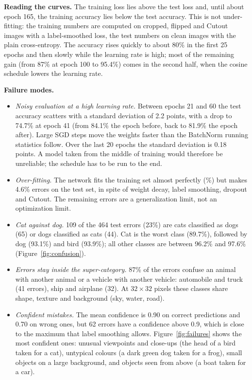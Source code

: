 \documentclass[11pt,a4paper]{article}
\begin{document}
\textbf{Reading the curves.} The training loss lies above the test loss and, until about epoch 165, the training accuracy lies below the test accuracy. This is not under-fitting: the training numbers are computed on cropped, flipped and Cutout images with a label-smoothed loss, the test numbers on clean images with the plain cross-entropy. The accuracy rises quickly to about 80\% in the first 25 epochs and then slowly while the learning rate is high; most of the remaining gain (from 87\% at epoch 100 to 95.4\%) comes in the second half, when the cosine schedule lowers the learning rate.

\textbf{Failure modes.}
\begin{itemize}
\item \emph{Noisy evaluation at a high learning rate.} Between epochs 21 and 60 the test accuracy scatters with a standard deviation of 2.2 points, with a drop to 74.7\% at epoch 41 (from 84.1\% the epoch before, back to 81.9\% the epoch after). Large SGD steps move the weights faster than the BatchNorm running statistics follow. Over the last 20 epochs the standard deviation is 0.18 points. A model taken from the middle of training would therefore be unreliable; the schedule has to be run to the end.
\item \emph{Over-fitting.} The network fits the training set almost perfectly (\BaselineTrainAcc\%) but makes 4.6\% errors on the test set, in spite of weight decay, label smoothing, dropout and Cutout. The remaining errors are a generalization limit, not an optimization limit.
\item \emph{Cat against dog.} 109 of the 464 test errors (23\%) are cats classified as dogs (65) or dogs classified as cats (44). Cat is the worst class (89.7\%), followed by dog (93.1\%) and bird (93.9\%); all other classes are between 96.2\% and 97.6\% (Figure~\ref{fig:confusion}).
\item \emph{Errors stay inside the super-category.} 87\% of the errors confuse an animal with another animal or a vehicle with another vehicle: automobile and truck (41 errors), ship and airplane (32). At $32\times32$ pixels these classes share shape, texture and background (sky, water, road).
\item \emph{Confident mistakes.} The mean confidence is 0.90 on correct predictions and 0.70 on wrong ones, but 62 errors have a confidence above 0.9, which is close to the maximum that label smoothing allows. Figure~\ref{fig:failures} shows the most confident ones: unusual viewpoints and close-ups (the head of a bird taken for a cat), untypical colours (a dark green dog taken for a frog), small objects on a large background, and objects seen from above (a boat taken for a car).
\end{itemize}
\end{document}
